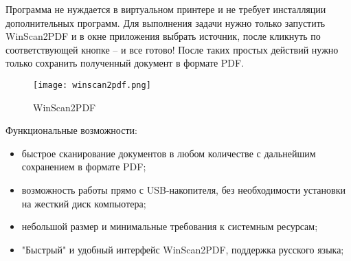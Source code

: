 Программа не нуждается в виртуальном принтере и не требует инсталляции дополнительных программ. Для выполнения задачи нужно только запустить WinScan2PDF и в окне приложения выбрать источник, после кликнуть по соответствующей кнопке – и все готово! После таких простых действий нужно только сохранить полученный документ в формате PDF.

\begin{figure}[h!]
	\centering
	\texttt{[image: winscan2pdf.png]}
	\caption{WinScan2PDF}
\end{figure}

Функциональные возможности:
\begin{itemize}
	\item быстрое сканирование документов в любом количестве с дальнейшим сохранением в формате PDF;
	\item возможность работы прямо с USB-накопителя, без необходимости установки на жесткий диск компьютера;
	\item небольшой размер и минимальные требования к системным ресурсам;
	\item "Быстрый" и удобный интерфейс WinScan2PDF, поддержка русского языка;
\end{itemize}